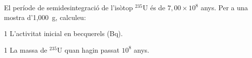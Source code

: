 El període de semidesintegració de l'isòtop $^{235}\mathrm{U}$ és de $7,00\times 10^{8}$ anys. Per a una mostra d'1,000~g, calculeu:

\begin{apartat}{1}
L'activitat inicial en becquerels (Bq).
\end{apartat}

\begin{apartat}{1}
La massa de $^{235}\mathrm{U}$ quan hagin passat $10^{8}$ anys.
\end{apartat}

